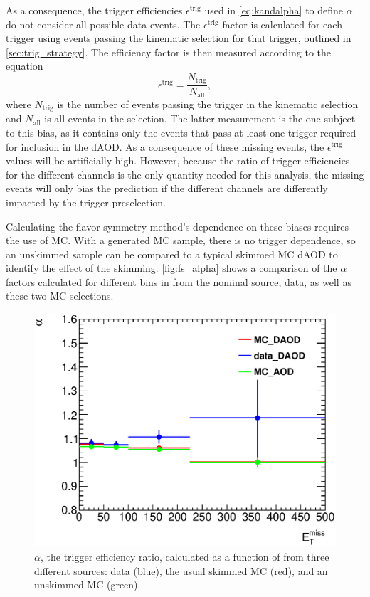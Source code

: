 As a consequence, the trigger efficiencies $\epsilon^\text{trig}$ used in \autoref{eq:kandalpha} to define $\alpha$ do not consider all possible data events. The $\epsilon^\text{trig}$ factor is calculated for each trigger using events passing the kinematic selection for that trigger, outlined in \autoref{sec:trig_strategy}. The efficiency factor is then measured according to the equation
%
\begin{equation}
\epsilon^\text{trig} = \frac{N_\text{trig}}{N_\text{all}} , 
\end{equation}
%
where $N_\text{trig}$ is the number of events passing the trigger in the kinematic selection and $N_\text{all}$ is all events in the selection. The latter measurement is the one subject to this bias, as it contains only the events that pass at least one trigger required for inclusion in the \ac{dAOD}. As a consequence of these missing events, the $\epsilon^\text{trig}$ values will be artificially high. However, because the ratio of trigger efficiencies for the different channels is the only quantity needed for this analysis, the missing events will only bias the prediction if the different channels are differently impacted by the trigger preselection.

Calculating the flavor symmetry method's dependence on these biases requires the use of \ac{MC}. With a generated \ac{MC} sample, there is no trigger dependence, so an unskimmed sample can be compared to a typical skimmed \ac{MC} \ac{dAOD} to identify the effect of the skimming. \autoref{fig:fs_alpha} shows a comparison of the $\alpha$ factors calculated for different bins in \met from the nominal source, data, as well as these two \ac{MC} selections. 

\begin{centering}
\begin{figure}[!hbt]
\myfloatalign
\includegraphics[width=.85\linewidth]{figures/fs/trigger_ratios.eps}
\caption{$\alpha$, the trigger efficiency ratio, calculated as a function of \met from three different sources: data (blue), the usual skimmed \ttbar \ac{MC} (red), and an unskimmed \ttbar \ac{MC} (green).}
\label{fig:fs_alpha}
\end{figure}
\end{centering}

